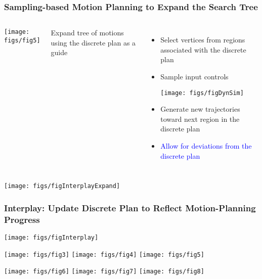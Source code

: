 \documentclass[10pt,t]{beamer}
\begin{document}
\begin{frame}
\frametitle{\hspace*{-4mm} Sampling-based Motion Planning to Expand the Search Tree \hspace*{-4mm}}

\begin{columns}[c]




\texttt{[image: figs/fig5]}



Expand tree of motions using the discrete plan as a guide

\vspace*{2mm}

\begin{itemize}
\item Select vertices from regions associated with the discrete plan

\item Sample input controls

\texttt{[image: figs/figDynSim]}

\item Generate new trajectories toward next region in the discrete
  plan

\item \textcolor{blue}{Allow for deviations from the
    discrete plan}
\end{itemize}

\end{columns}


\vspace*{2mm}
{\hfill{\texttt{[image: figs/figInterplayExpand]}}}

\end{frame}


\begin{frame}
\frametitle{{\large{Interplay: Update Discrete Plan to Reflect Motion-Planning
Progress}}}


\vspace*{-2mm}
\centerline{\texttt{[image: figs/figInterplay]}}

\vspace*{2mm}

\texttt{[image: figs/fig3]}
\texttt{[image: figs/fig4]}
\texttt{[image: figs/fig5]}

\texttt{[image: figs/fig6]}
\texttt{[image: figs/fig7]}
\texttt{[image: figs/fig8]}


\end{frame}
\end{document}
